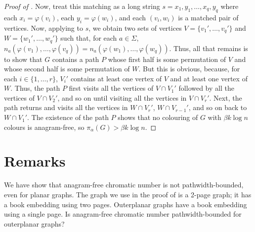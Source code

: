 \documentclass{patmorin}
\begin{document}
\begin{proof}[Proof of ]
Now, treat this matching as a long string $s=x_1,y_1,\ldots,x_q,y_q$
where each $x_i=\varphi(v_i)$, each $y_i=\varphi(w_i)$, and each
$(v_i,w_i)$ is a matched pair of vertices.  Now, applying
 to $s$, we obtain two sets of vertices
$V=\{v_1',\ldots,v_q'\}$ and $W=\{w_1',\ldots,w_q'\}$ such that, 
for each $a\in\Sigma$,
$n_a(\varphi(v_1),\ldots,\varphi(v_q))=n_a(\varphi(w_1),\ldots,\varphi(w_q))$.
Thus, all that remains is to show that $G$ contains a path $P$ whose first
half is some permutation of $V$ and whose second half
is some permutation of $W$.  But this is obvious, because,
for each $i\in\{1,\ldots,r\}$, $V_i'$ contains at least one vertex of $V$
and at least one vertex of $W$.  Thus, the path $P$ first visits all the
vertices of $V\cap V_1'$ followed by all the vertices of $V\cap V_2'$,
and so on until visiting all the vertices in $V\cap V_r'$. Next, the path
returns and visits all the vertices in $W\cap V_r'$, $W\cap V_{r-1}'$,
and so on back to $W\cap V_1'$.  The existence of the path $P$ shows
that no colouring of $G$ with $\beta k\log n$ colours is anagram-free, so $\pi_\alpha(G) > \beta k\log n$.
\end{proof}

\section{Remarks}

We have show that anagram-free chromatic number is not pathwidth-bounded,
even for planar graphs.  The graph we use in the proof of 
is a 2-page graph; it has a book embedding using two pages.  Outerplanar
graphs have a book embedding using a single page.  Is anagram-free
chromatic number pathwidth-bounded for outerplanar graphs?




\end{document}
